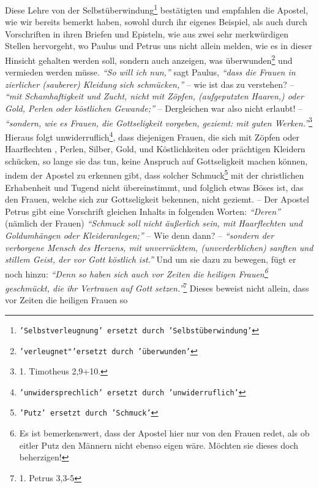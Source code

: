 Diese Lehre von der Selbstüberwindung\footnote{\texttt{'Selbstverleugnung'
ersetzt 
durch 'Selbstüberwindung'}} bestätigten und empfahlen die Apostel, wie
wir bereits bemerkt haben, sowohl durch ihr eigenes Beispiel, als auch durch
Vorschriften in ihren Briefen und Episteln, wie aus zwei sehr merkwürdigen
Stellen hervorgeht, wo Paulus und Petrus uns nicht allein melden, wie es in
dieser Hinsicht gehalten werden soll, sondern auch anzeigen, was
überwunden\footnote{\texttt{'verleugnet"'ersetzt durch 'überwunden'}} und
vermieden werden müsse. \textit{"`So will ich nun,"'} sagt
Paulus,
\textit{"`dass die Frauen in
zierlicher (sauberer) Kleidung sich schmücken,"'} -- wie ist das zu verstehen?
--
\textit{"`mit Schamhaftigkeit und Zucht, nicht mit Zöpfen, (aufgeputzten
Haaren,) oder
Gold, Perlen oder köstlichen Gewande;"'} -- Dergleichen war also nicht
erlaubt! -- \textit{"`sondern, wie es Frauen, die Gottseligkeit vorgeben,
geziemt: mit
guten Werken."'}\footnote{1. Timotheus 2,9+10.}
Hieraus folgt unwiderruflich\footnote{\texttt{'unwidersprechlich' ersetzt durch
'unwiderruflich'}}, dass
diejenigen Frauen, die sich mit Zöpfen oder
Haarflechten \label{ref:haarflechten}, Perlen, Silber, Gold,
und Köstlichkeiten oder prächtigen Kleidern schücken, so lange sie das tun,
keine Anspruch auf Gottseligkeit machen können, indem der
Apostel zu erkennen
gibt, dass solcher Schmuck\footnote{\texttt{'Putz' ersetzt durch 'Schmuck'}}
mit 
der christlichen Erhabenheit und Tugend nicht
übereinstimmt, und folglich etwas Böses ist, das den Frauen, welche sich zur
Gottseligkeit bekennen, nicht geziemt. -- Der Apostel Petrus gibt eine
Vorschrift gleichen Inhalts in folgenden Worten: \textit{"`Deren"'} (nämlich der
Frauen)
\textit{"`Schmuck soll nicht äußerlich sein, mit Haarflechten und Goldumhängen
oder
Kleideranlegen;"'} -- Wie denn dann? --
\textit{"`sondern der verborgene Mensch des Herzens,
mit unverrücktem, (unverderblichen) sanften und stillem Geist, der vor Gott
köstlich ist."'} Und um sie dazu zu bewegen, fügt er noch hinzu:
\textit{"`Denn so haben
sich auch vor Zeiten die heiligen Frauen\footnote{Es ist bemerkenswert, dass der
Apostel hier nur von den Frauen redet, als ob eitler Putz den
Männern nicht ebenso eigen wäre. Möchten sie dieses doch beherzigen!}
geschmückt,
die ihr Vertrauen auf Gott setzen."'}\footnote{1. Petrus 3,3-5}
Dieses beweist nicht allein, dass vor Zeiten die heiligen
Frauen so 
